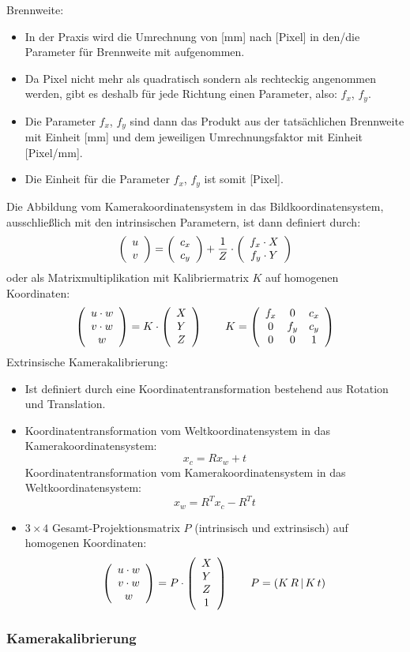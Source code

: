 Brennweite:
\begin{itemize}
\item In der Praxis wird die Umrechnung von [mm] nach [Pixel] in den/die Parameter für Brennweite mit aufgenommen.
\item Da Pixel nicht mehr als quadratisch sondern als rechteckig angenommen werden, gibt es deshalb für jede Richtung einen Parameter, also: $f_x$, $f_y$.
\item Die Parameter $f_x$, $f_y$ sind dann das Produkt aus der tatsächlichen Brennweite mit Einheit [mm] und dem jeweiligen Umrechnungsfaktor mit Einheit [Pixel/mm].
\item Die Einheit für die Parameter $f_x$, $f_y$ ist somit [Pixel].
\end{itemize}
Die Abbildung vom Kamerakoordinatensystem in das Bildkoordinatensystem, ausschließlich mit den intrinsischen Parametern, ist dann definiert durch: $$\left( \begin{array}{c} u \\ v \end{array} \right) = \left( \begin{array}{c} c_x \\ c_y \end{array} \right) + \frac{1}{Z} \cdot \left( \begin{array}{c} f_x \cdot X \\ f_y \cdot Y \end{array} \right)$$ oder als Matrixmultiplikation mit Kalibriermatrix $K$ auf homogenen Koordinaten: $$\left( \begin{array}{c} u \cdot w \\ v \cdot w \\ w \end{array} \right) = K \cdot \left( \begin{array}{c} X \\ Y \\ Z \end{array} \right) \qquad K = \left( \begin{array}{ccc} f_x & 0 & c_x \\ 0 & f_y & c_y \\ 0 & 0 & 1 \end{array} \right)$$
Extrinsische Kamerakalibrierung:
\begin{itemize}
\item Ist definiert durch eine Koordinatentransformation bestehend aus Rotation und Translation.
\item Koordinatentransformation vom Weltkoordinatensystem in das Kamerakoordinatensystem: $$x_c = Rx_w + t$$
Koordinatentransformation vom Kamerakoordinatensystem in das Weltkoordinatensystem: $$x_w = R^T x_c - R^T t$$
\item $3 \times 4$ Gesamt-Projektionsmatrix $P$ (intrinsisch und extrinsisch) auf homogenen Koordinaten: $$\left( \begin{array}{c} u \cdot w \\ v \cdot w \\ w \end{array} \right) = P \cdot \left( \begin{array}{c} X \\ Y \\ Z \\ 1 \end{array} \right) \qquad P = (K \, R \, | \, K \, t)$$
\end{itemize}

\subsubsection*{Kamerakalibrierung}


